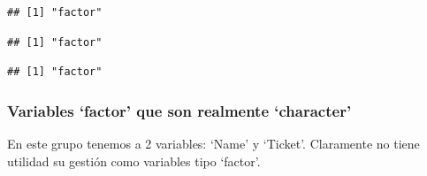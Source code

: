 \documentclass[]{article}
\newenvironment{Shaded}{\begin{snugshade}}{\end{snugshade}}
\newcommand{\KeywordTok}[1]{\textcolor[rgb]{0.13,0.29,0.53}{\textbf{#1}}}
\newcommand{\StringTok}[1]{\textcolor[rgb]{0.31,0.60,0.02}{#1}}
\newcommand{\CommentTok}[1]{\textcolor[rgb]{0.56,0.35,0.01}{\textit{#1}}}
\newcommand{\OperatorTok}[1]{\textcolor[rgb]{0.81,0.36,0.00}{\textbf{#1}}}
\newcommand{\NormalTok}[1]{#1}
\begin{document}
\begin{Shaded}
\end{Shaded}

\begin{verbatim}
## [1] "factor"
\end{verbatim}

\begin{Shaded}
\end{Shaded}

\begin{verbatim}
## [1] "factor"
\end{verbatim}

\begin{Shaded}
\end{Shaded}

\begin{verbatim}
## [1] "factor"
\end{verbatim}

\subsubsection{\texorpdfstring{Variables `factor' que son realmente
`character'}{Variables factor que son realmente character}}\label{variables-factor-que-son-realmente-character}

En este grupo tenemos a 2 variables: `Name' y `Ticket'. Claramente no
tiene utilidad su gestión como variables tipo `factor'.
\end{document}
